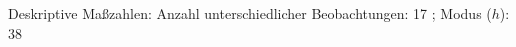 				\label{tableValues:cjob0521a_g3}
				\vspace*{-\baselineskip}
                    \begin{noten}
                	    \note{} Deskriptive Maßzahlen:
                	    Anzahl unterschiedlicher Beobachtungen: 17%
                	    ; 
                	      Modus ($h$): 38
                     \end{noten}


